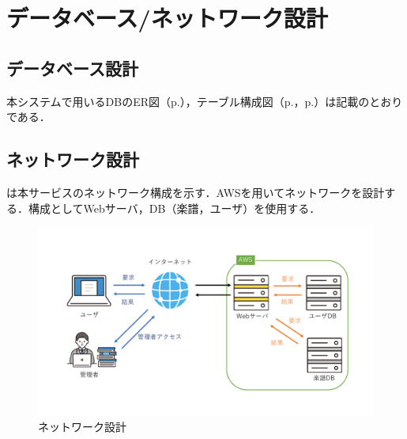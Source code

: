\chapter{データベース/ネットワーク設計}
\section*{データベース設計}
本システムで用いるDBのER図（p.\pageref{fig:ER図}），テーブル構成図（p.\pageref{tableDesgin1}，p.\pageref{tableDesgin2}）は記載のとおりである．
\section*{ネットワーク設計}
は本サービスのネットワーク構成を示す．AWSを用いてネットワークを設計する．構成としてWebサーバ，DB（楽譜，ユーザ）を使用する．
\begin{figure}[b]
    \centering
    \includegraphics[keepaspectratio,width=\textwidth]{db-nwDesign/networkDesign.pdf}
    \caption{ネットワーク設計}\label{fig:ネットワーク設計}
\end{figure}
